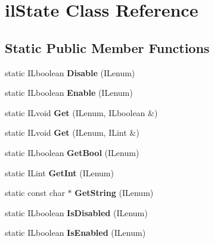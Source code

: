 \hypertarget{classilState}{
\section{ilState Class Reference}
\label{classilState}
}
\subsection*{Static Public Member Functions}
\begin{DoxyCompactItemize}
\item 
\hypertarget{classilState_a268fd74c2e136371f87ff9b274e2d624}{
static ILboolean {\bfseries Disable} (ILenum)}
\label{classilState_a268fd74c2e136371f87ff9b274e2d624}

\item 
\hypertarget{classilState_a36430dec38f2372a2691b39173552d46}{
static ILboolean {\bfseries Enable} (ILenum)}
\label{classilState_a36430dec38f2372a2691b39173552d46}

\item 
\hypertarget{classilState_ab79dce3bb0b4f3493f6aa3da32729dc7}{
static ILvoid {\bfseries Get} (ILenum, ILboolean \&)}
\label{classilState_ab79dce3bb0b4f3493f6aa3da32729dc7}

\item 
\hypertarget{classilState_acd122a01adf3d2bafd1c83ea2e02824c}{
static ILvoid {\bfseries Get} (ILenum, ILint \&)}
\label{classilState_acd122a01adf3d2bafd1c83ea2e02824c}

\item 
\hypertarget{classilState_aca8a4b62a2d7c6fdab01651c4406185e}{
static ILboolean {\bfseries GetBool} (ILenum)}
\label{classilState_aca8a4b62a2d7c6fdab01651c4406185e}

\item 
\hypertarget{classilState_a1ef08250ebc59d85be7ac76bff1984ae}{
static ILint {\bfseries GetInt} (ILenum)}
\label{classilState_a1ef08250ebc59d85be7ac76bff1984ae}

\item 
\hypertarget{classilState_ab329213345ecd03ae6b5596a321ad12e}{
static const char $\ast$ {\bfseries GetString} (ILenum)}
\label{classilState_ab329213345ecd03ae6b5596a321ad12e}

\item 
\hypertarget{classilState_ab781af41cf8e62172e227f54863dddd4}{
static ILboolean {\bfseries IsDisabled} (ILenum)}
\label{classilState_ab781af41cf8e62172e227f54863dddd4}

\item 
\hypertarget{classilState_a3a825abb8673d607bc7236582706fb61}{
static ILboolean {\bfseries IsEnabled} (ILenum)}
\label{classilState_a3a825abb8673d607bc7236582706fb61}


\end{DoxyCompactItemize}
